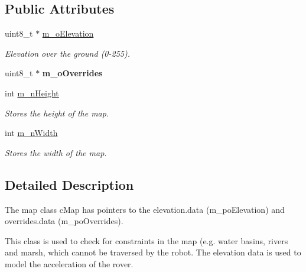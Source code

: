 \subsection*{Public Attributes}
\begin{DoxyCompactItemize}
\item 
\mbox{\label{classplanner_1_1c_graph_aea1ab1d83e0e58f454f07a46fc0d40dd}} 
uint8\+\_\+t $\ast$ \mbox{\hyperlink{classplanner_1_1c_graph_aea1ab1d83e0e58f454f07a46fc0d40dd}{m\+\_\+o\+Elevation}}
\begin{DoxyCompactList}\small\item\em Elevation over the ground (0-\/255). \end{DoxyCompactList}\item 
\mbox{\label{classplanner_1_1c_graph_a0794d9865c56cddd3d051e6ea0c1c756}} 
uint8\+\_\+t $\ast$ {\bfseries m\+\_\+o\+Overrides}
\item 
\mbox{\label{classplanner_1_1c_graph_a5bb5ea1aa1709b4530bbf5f931c1f277}} 
int \mbox{\hyperlink{classplanner_1_1c_graph_a5bb5ea1aa1709b4530bbf5f931c1f277}{m\+\_\+n\+Height}}
\begin{DoxyCompactList}\small\item\em Stores the height of the map. \end{DoxyCompactList}\item 
\mbox{\label{classplanner_1_1c_graph_a91f89c2fde0344dc74060297b2d5235e}} 
int \mbox{\hyperlink{classplanner_1_1c_graph_a91f89c2fde0344dc74060297b2d5235e}{m\+\_\+n\+Width}}
\begin{DoxyCompactList}\small\item\em Stores the width of the map. \end{DoxyCompactList}\end{DoxyCompactItemize}


\subsection{Detailed Description}
The map class c\+Map has pointers to the elevation.\+data (m\+\_\+po\+Elevation) and overrides.\+data (m\+\_\+po\+Overrides). 

This class is used to check for constraints in the map (e.\+g. water basins, rivers and marsh, which cannot be traversed by the robot. The elevation data is used to model the acceleration of the rover. 

